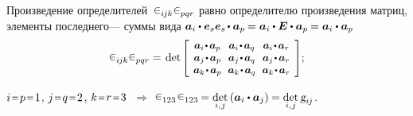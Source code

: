 \begin{otherlanguage}{russian}
\vspace{0.2em} \noindent Произведение определителей~${\levicivita_{i\hspace{-0.1ex}jk} \levicivita_{pqr}}$ равно определителю произведения матриц, элементы последнего\:--- суммы вида ${\bm{a}_i \dotp \bm{e}_s \bm{e}_s \hspace{-0.2ex} \dotp \bm{a}_p \hspace{-0.12ex}= \bm{a}_i \dotp \bm{E} \dotp \bm{a}_p \hspace{-0.12ex}= \bm{a}_i \dotp \bm{a}_p}$ %
\[
\levicivita_{i\hspace{-0.1ex}jk} \levicivita_{pqr} = \hspace{0.25ex}
\operatorname{det}\hspace{-0.1ex}
\scalebox{0.92}[0.92]{$\left[\hspace{-0.16ex}\begin{array}{c@{\hspace{0.64em}}c@{\hspace{0.64em}}c}
\bm{a}_i \narrowdotp\hspace{0.12ex} \bm{a}_p & \bm{a}_i \narrowdotp\hspace{0.12ex} \bm{a}_q & \bm{a}_i \narrowdotp\hspace{0.12ex} \bm{a}_r \\
\bm{a}_j \narrowdotp\hspace{0.12ex} \bm{a}_p & \bm{a}_j \narrowdotp\hspace{0.12ex} \bm{a}_q & \bm{a}_j \narrowdotp\hspace{0.12ex} \bm{a}_r \\
\bm{a}_k \narrowdotp\hspace{0.12ex} \bm{a}_p & \bm{a}_k \narrowdotp\hspace{0.12ex} \bm{a}_q & \bm{a}_k \narrowdotp\hspace{0.12ex} \bm{a}_r
\end{array}\hspace{-0.12ex}\right]$} ;
\]

\vspace{0.12em}\noindent ${i \narroweq p \narroweq 1}$, ${j \narroweq q \narroweq 2}$, ${k \narroweq r \narroweq 3}$ ${\,\Rightarrow}$ ${\levicivita_{123} \hspace{0.2ex} \levicivita_{123} \hspace{-0.12ex}= \underset{i,\hspace{0.1ex}j}{\operatorname{det}} \left( \bm{a}_i \dotp \bm{a}_j \right) \hspace{-0.1ex}= \underset{i,\hspace{0.1ex}j}{\operatorname{det}} \, \textsl{g}_{i\hspace{-0.1ex}j}}$.


\end{otherlanguage}
